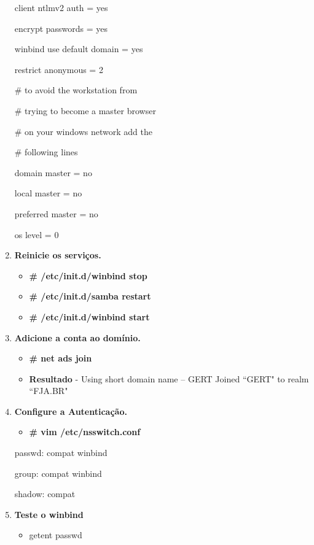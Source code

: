 \begin{enumerate}
        	client ntlmv2 auth = yes

        	encrypt passwords = yes

        	winbind use default domain = yes

        	restrict anonymous = 2

			\# to avoid the workstation from

			\# trying to become a master browser

			\# on your windows network add the

			\# following lines

        	domain master = no

        	local master = no

        	preferred master = no

        	os level = 0

	\item \textbf{Reinicie os serviços.}
		\begin{itemize}
			\item \textbf{\# /etc/init.d/winbind stop}
			\item \textbf{\# /etc/init.d/samba restart}
			\item \textbf{\# /etc/init.d/winbind start}
		\end{itemize}

	\item \textbf{Adicione a conta ao domínio.}
		\begin{itemize}
			\item \textbf{\# net ads join}
			\item \textbf{Resultado} - Using short domain name – GERT Joined ``GERT" to realm ``FJA.BR"
		\end{itemize}

	\item \textbf{Configure a Autenticação.}
		\begin{itemize}
			\item \textbf{\# vim /etc/nsswitch.conf}
		\end{itemize}

		passwd:         compat winbind

		group:          compat winbind

		shadow:         compat

 	\item \textbf{Teste o winbind}
		\begin{itemize}
			\item {getent passwd}
		\end{itemize}


\end{enumerate}
